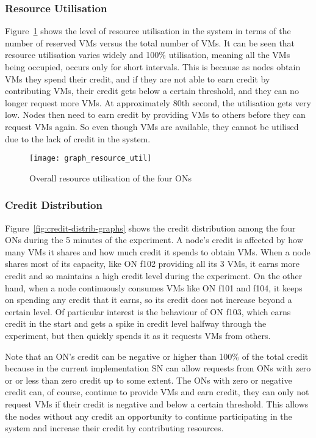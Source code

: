 \subsubsection{Resource Utilisation}

Figure~\ref{fig:resource-util-graphs} shows the level of resource utilisation in the system in terms of the number of reserved VMs versus the total number of VMs.
It can be seen that resource utilisation varies widely and 100\% utilisation, meaning all the VMs being occupied, occurs only for short intervals.
This is because as nodes obtain VMs they spend their credit, 
and if they are not able to earn credit by contributing VMs, 
their credit gets below a certain threshold, and they can no longer request more VMs.
At approximately 80th second, the utilisation gets very low.
Nodes then need to earn credit by providing VMs to others before they can request VMs again.
So even though VMs are available, they cannot be utilised due to the lack of credit in the system.

\begin{figure}[tbp]
	\centering
		\texttt{[image: graph\_resource\_util]}
		\caption{Overall resource utilisation of the four ONs}
		\label{fig:resource-util-graphs}
\end{figure}


\subsubsection{Credit Distribution}

Figure~\ref{fig:credit-distrib-graphs} shows the credit distribution among the four ONs during the 5 minutes of the experiment.
A node's credit is affected by how many VMs it shares and how much credit it spends to obtain VMs.
When a node shares most of its capacity, like ON f102 providing all its 3 VMs, 
it earns more credit and so maintains a high credit level during the experiment.
On the other hand, when a node continuously consumes VMs like ON f101 and f104, 
it keeps on spending any credit that it earns, so its credit does not increase beyond a certain level. 
Of particular interest is the behaviour of ON f103, which earns credit in the start and gets a spike in credit level halfway through the experiment, but then quickly spends it as it requests VMs from others.

Note that an ON's credit can be negative or higher than 100\% of the total credit 
because in the current implementation SN can allow requests from ONs with zero or or less than zero credit up to some extent. 
The ONs with zero or negative credit can, of course, continue to provide VMs and earn credit, they can only not request VMs if their credit is negative and below a certain threshold.
This allows the nodes without any credit an opportunity to continue participating in the system and increase their credit by contributing resources. 

